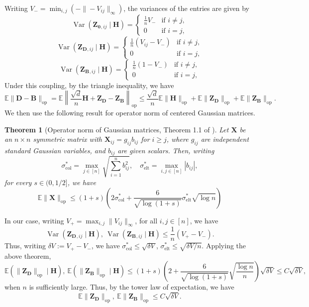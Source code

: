 \documentclass[11pt, titlepage]{article} %
\numberwithin{equation}{section}
\newtheorem{theorem}{Theorem}
\theoremstyle{definition}
\numberwithin{theorem}{section}
\numberwithin{lemma}{section}
\numberwithin{corollary}{section}
\numberwithin{proposition}{section}
\numberwithin{definition}{section}
\numberwithin{remark}{section}
\begin{document}
Writing $V_- = \min_{i,j} \left(-\|- V_{ij}\|_\infty\right)$, the variances of the entries are given by
\[
\operatorname{Var}(\bm{Z_0}{}_{,ij}\mid \bm{H}) = \begin{cases}
\frac{1}{n}V_- & \text{if } i \neq j,\\
0 & \text{if } i = j,
\end{cases}
\]
\[
\operatorname{Var}(\bm{Z_D}{}_{,ij}\mid \bm{H}) = \begin{cases}
\frac{1}{n}(V_{ij} - V_-) & \text{if } i \neq j,\\
0 & \text{if } i = j,
\end{cases}
\]
\[
\operatorname{Var}(\bm{Z_B}{}_{,ij}\mid \bm{H}) = \begin{cases}
\frac{1}{n}(1 - V_-) & \text{if } i \neq j,\\
0 & \text{if } i = j,
\end{cases}
\]
Under this coupling, by the triangle inequality, we have
\[
\mathbb{E} \| \bm{D} - \bm{B}\|_{\mathrm{op}} =
\mathbb{E} \left\|\frac{\sqrt{d}}{n} \bm{H} + \bm{Z_D} - \bm{Z_B}\right\|_{\mathrm{op}}
\leq \frac{\sqrt{d}}{n} \mathbb{E} \|\bm{H}\|_{\mathrm{op}} + \mathbb{E} \|\bm{Z_D}\|_{\mathrm{op}} 
+ \mathbb{E} \|\bm{Z_B}\|_{\mathrm{op}}.
\]
We then use the following result for operator norm of centered Gaussian matrices.
\begin{theorem}[Operator norm of Gaussian matrices, Theorem 1.1 of \cite{Ban16}]
\label{thm:gaussian.op}
Let $\bm{X}$ be an $n \times n$ symmetric matrix with $\bm{X}_{ij} = g_{ij}b_{ij}$ for $i \geq j$, 
where $g_{ij}$ are independent standard Gaussian variables, and $b_{ij}$ are given scalars. 
Then, writing 
\[
\sigma^*_\text{col} = \max_{j \in [n]} \sqrt{\sum_{i=1}^n b_{ij}^2}, \quad
\sigma^*_\text{elt} = \max_{i,j \in [n]} |b_{ij}|,
\]
for every $s\in (0,1/2]$, we have
\[
\mathbb{E} \| \bm{X} \|_{\mathrm{op}} \leq (1+s) \left(2\sigma^*_\text{col} 
+ \frac{6}{\sqrt{\log(1+s)}} \sigma^*_\text{elt} \sqrt{\log n}\right)
\]
\end{theorem}
In our case, writing $V_+ = \max_{i,j} \|V_{ij}\|_\infty$, for all $i, j \in [n]$, we have
\[ 
\operatorname{Var}(\bm{Z_D}{}_{,ij} \mid \bm{H}),\ \operatorname{Var}(\bm{Z_B}{}_{,ij} \mid \bm{H}) 
\leq \frac{1}{n}(V_+ - V_-).
\]
Thus, writing $\delta V := V_+ - V_-$, we have $\sigma^*_\text{col} \leq \sqrt{\delta V}$, 
$\sigma^*_\text{elt} \leq \sqrt{\delta V / n}$. Applying the above theorem,
\[
\mathbb{E} \left(\|\bm{Z_D}\|_{\mathrm{op}} \mid \bm{H}\right), 
\ \mathbb{E} \left(\|\bm{Z_B}\|_{\mathrm{op}} \mid \bm{H}\right)
\leq (1+s) \left(2 + \frac{6}{\sqrt{\log(1+s)}} \sqrt{\frac{\log n}{n}} \right)\sqrt{\delta V}
\leq C \sqrt{\delta V},
\]
when $n$ is sufficiently large. Thus, by the tower law of expectation, we have
\[
\mathbb{E} \| \bm{Z_D}\|_{\mathrm{op}}, \ \mathbb{E} \| \bm{Z_B}\|_{\mathrm{op}}
\leq C \sqrt{\delta V}.
\]
\end{document}
